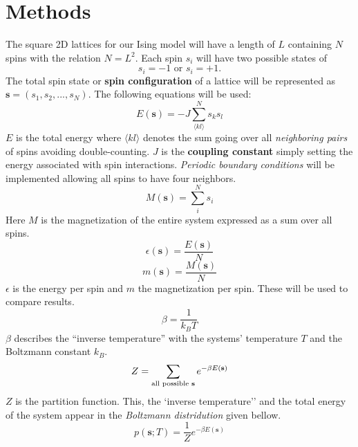 \documentclass[english,notitlepage,reprint,nofootinbib]{revtex4-1}  %
\begin{document}
\section{Methods}\label{sec:methods}
The square 2D lattices for our Ising model will have a length of $L$ containing $N$ spins with the relation $N = L^2$. Each spin $s_i$ will have two possible states of 
\begin{equation}
    s_i = -1 \text{ or } s_i = +1.
\end{equation}
The total spin state or \textbf{spin configuration} of a lattice will be represented as $\textbf{s} = (s_1, s_2, ..., s_N)$. The following equations will be used:
\begin{equation}
    E(\textbf{s}) = - J \sum^N_{\langle kl \rangle} s_k s_l
\end{equation}
$E$ is the total energy where $\langle kl \rangle$ denotes the sum going over all \textit{neighboring pairs} of spins avoiding double-counting. $J$ is the \textbf{coupling constant} simply setting the energy associated with spin interactions. \textit{Periodic boundary conditions} will be implemented allowing all spins to have four neighbors.
\begin{equation}
    M(\textbf{s}) = \sum^N_i s_i
\end{equation}
Here $M$ is the magnetization of the entire system expressed as a sum over all spins.
\begin{equation}
    \epsilon(\textbf{s}) = \frac{E(\textbf{s})}{N}
\end{equation}
\begin{equation}
    m(\textbf{s}) = \frac{M(\textbf{s})}{N}
\end{equation}
$\epsilon$ is the energy per spin and $m$ the magnetization per spin. These will be used to compare results.
\begin{equation}
    \beta = \frac{1}{k_B T}
\end{equation}
$\beta$ describes the ``inverse temperature'' with the systems' temperature $T$ and the Boltzmann constant $k_B$.
\begin{equation}
    Z = \sum_{\text{all possible \textbf{s}}} e^{- \beta E(\textbf{s})}
\end{equation}
$Z$ is the partition function. This, the `inverse temperature'' and the total energy of the system appear in the \textit{Boltzmann distridution} given bellow.
\begin{equation}
    p(\textbf{s};T) = \frac{1}{Z} e^{-\beta E(\textbf{s})}
\end{equation}
\end{document}
